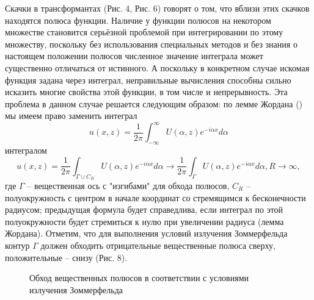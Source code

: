 \documentclass[a4paper, 12pt]{article}
\begin{document}
Скачки в трансформантах (Рис. 4, Рис. 6) говорят о том, что вблизи этих скачков находятся полюса функции. Наличие у функции полюсов на некотором множестве становится серьёзной проблемой при интегрировании по этому множеству, поскольку без использования специальных методов и без знания о настоящем положении полюсов численное значение интеграла может существенно отличаться от истинного. А поскольку в конкретном случае искомая функция задана через интеграл, неправильные вычисления способны сильно исказить многие свойства этой функции, в том числе и непрерывность. Эта проблема в данном случае решается следующим образом: по лемме Жордана (\cite{new,tfkp,korn}) мы имеем право заменить интеграл
$$u(x,z) =\frac{1}{2\pi} \int^{\infty}_{-\infty} U(\alpha, z) e^{-i \alpha x} d\alpha$$
интегралом
$$u(x,z) =\frac{1}{2\pi} \int_{\Gamma\cup C_R} U(\alpha, z) e^{-i \alpha x} d\alpha \rightarrow\frac{1}{2\pi} \int_{\Gamma} U(\alpha, z) e^{-i \alpha x} d\alpha, R\rightarrow \infty,$$
где $\Gamma$ -- вещественная ось с "изгибами" для обхода полюсов, $C_R$ -- полуокружность с центром в начале координат со стремящимся к бесконечности радиусом; предыдущая формула будет справедлива, если интеграл по этой полуокружности будет стремиться к нулю при увеличении радиуса (лемма Жордана). Отметим, что для выполнения условий излучения Зоммерфельда контур $\Gamma$ должен обходить отрицательные вещественные полюса сверху, положительные -- снизу (Рис. 8).
\begin{figure}[h!]
\noindent{}
\caption{Обход вещественных полюсов в соответствии с условиями излучения Зоммерфельда}
\label{figCurves}
\end{figure} 
\end{document}
